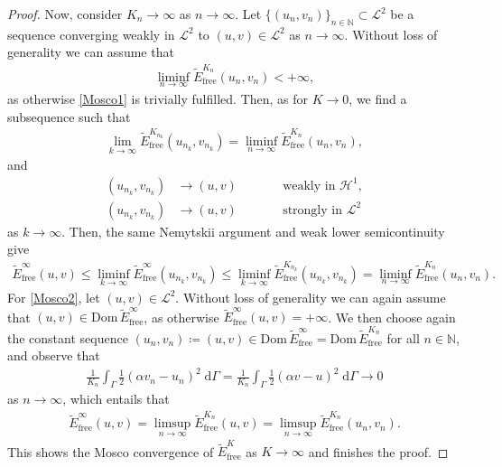 \documentclass[10pt,a4paper]{amsart}
\newcommand{\Ga}{\Gamma}
\newcommand{\N}{\mathbb N}
\newcommand{\dG}{\;\mathrm d\Ga}
\newcommand{\free}{\mathrm{free}}
\newcommand{\intG}{\int_\Gamma}
\begin{document}
\begin{proof}
    Now, consider $K_n\rightarrow\infty$ as $n\rightarrow\infty$. Let $\{(u_n,v_n)\}_{n\in\N}\subset\mathcal{L}^2$ be a sequence converging weakly in $\mathcal{L}^2$ to $(u,v)\in\mathcal{L}^2$ as $n\rightarrow\infty$. Without loss of generality we can assume that 
    \begin{align*}
        \liminf_{n\rightarrow\infty} \widetilde E_\free^{K_n}(u_n,v_n) < + \infty,
    \end{align*}
    as otherwise \ref{Mosco1} is trivially fulfilled. Then, as for $K\rightarrow 0$, we find a subsequence such that
    \begin{align*}
        \lim_{k\rightarrow\infty} \widetilde E_\free^{K_{n_k}}(u_{n_k},v_{n_k}) = \liminf_{n\rightarrow\infty} \widetilde E_\free^{K_n}(u_n,v_n),
    \end{align*}
    and
    \begin{subequations}
        \begin{alignat}{2}
            (u_{n_k},v_{n_k}) &\rightarrow (u,v) &&\qquad\text{weakly in~}\mathcal{H}^1, \label{Prelim:Mosco:WeakConv:infty} \\
            (u_{n_k},v_{n_k}) &\rightarrow (u,v) &&\qquad \text{strongly in~}\mathcal{L}^2 \label{Prelim:Mosco:StrongConv:infty}
        \end{alignat}
    \end{subequations}
    as $k\rightarrow\infty$. Then, the same Nemytskii argument and weak lower semicontinuity give
    \begin{align*}
        \widetilde E_\free^\infty(u,v) \leq \liminf_{k\rightarrow\infty} \widetilde E_\free^\infty(u_{n_k},v_{n_k}) \leq \liminf_{k\rightarrow\infty} \widetilde E_\free^{K_{n_k}}(u_{n_k},v_{n_k}) = \liminf_{n\rightarrow\infty} \widetilde E_\free^{K_n}(u_n,v_n).
    \end{align*}
    For \ref{Mosco2}, let $(u,v)\in\mathcal{L}^2$. Without loss of generality we can again assume that $(u,v)\in\mathrm{Dom}\,\widetilde E_\free^\infty$, as otherwise $\widetilde E_\free^\infty(u,v) = +\infty$. We then choose again the constant sequence $(u_n,v_n)\coloneqq (u,v) \in\mathrm{Dom}\,\widetilde E_\free^\infty = \mathrm{Dom}\,\widetilde E_\free^{K_n}$ for all $n\in\N$, and observe that
    \begin{align*}
        \frac{1}{K_n}\intG \frac12(\alpha v_n - u_n)^2\dG = \frac{1}{K_n}\intG \frac12(\alpha v - u)^2\dG \rightarrow 0
    \end{align*}
    as $n\rightarrow\infty$, which entails that
    \begin{align*}
        \widetilde E_\free^\infty(u,v) = \limsup_{n\rightarrow\infty} \widetilde E_\free^{K_n}(u,v) = \limsup_{n\rightarrow\infty} \widetilde E_\free^{K_n}(u_n,v_n).
    \end{align*}
    This shows the Mosco convergence of $\widetilde E_\free^K$ as $K\rightarrow\infty$ and finishes the proof.
\end{proof}
\end{document}
